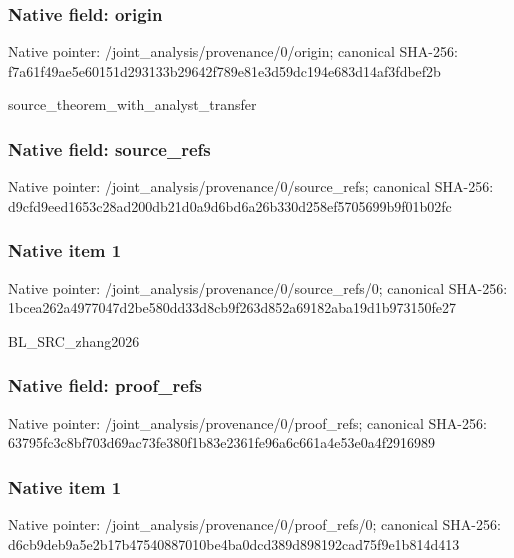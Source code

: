 \documentclass[10pt,a4paper]{article}
\begin{document}
\subsubsection{Native field: origin}


Native pointer: /joint\_analysis/provenance/0/origin; canonical SHA-256: f7a61f49ae5e60151d293133\allowbreak{}b29642f789e81e3d59dc194e\allowbreak{}683d14af3fdbef2b


source\_theorem\_with\_analyst\_transfer


\subsubsection{Native field: source\_refs}


Native pointer: /joint\_analysis/provenan\allowbreak{}ce/0/source\_refs; canonical SHA-256: d9cfd9eed1653c28ad200db2\allowbreak{}1d0a9d6bd6a26b330d258ef5\allowbreak{}705699b9f01b02fc



\subsubsection{Native item 1}


Native pointer: /joint\_analysis/provenan\allowbreak{}ce/0/source\_refs/0; canonical SHA-256: 1bcea262a4977047d2be580d\allowbreak{}d33d8cb9f263d852a69182ab\allowbreak{}a19d1b973150fe27


BL\_SRC\_zhang2026


\subsubsection{Native field: proof\_refs}


Native pointer: /joint\_analysis/provenance/0/proof\_refs; canonical SHA-256: 63795fc3c8bf703d69ac73fe\allowbreak{}380f1b83e2361fe96a6c661a\allowbreak{}4e53e0a4f2916989



\subsubsection{Native item 1}


Native pointer: /joint\_analysis/provenan\allowbreak{}ce/0/proof\_refs/0; canonical SHA-256: d6cb9deb9a5e2b17b4754088\allowbreak{}7010be4ba0dcd389d898192c\allowbreak{}ad75f9e1b814d413
\end{document}
